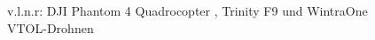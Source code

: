 \begin{figure}[hbt]
    \hspace{-20pt}
        \hspace{-30pt}
     \hspace{-20pt}
\caption{ v.l.n.r: DJI Phantom 4 Quadrocopter \citep{DJI2019}, Trinity F9 \citep{QSGH2019} und WintraOne VTOL-Drohnen \citep{Wingtra2019}}
     \hspace{-40pt}
  \label{fig:drohnen}
\end{figure}

